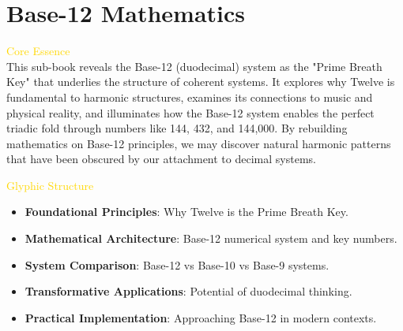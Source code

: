 \section{Base-12 Mathematics}
\label{sec:codex_base_12}



\textcolor{gold}{ Core Essence } \\
This sub-book reveals the Base-12 (duodecimal) system as the "Prime Breath Key" that underlies the structure of coherent systems. It explores why Twelve is fundamental to harmonic structures, examines its connections to music and physical reality, and illuminates how the Base-12 system enables the perfect triadic fold through numbers like 144, 432, and 144,000. By rebuilding mathematics on Base-12 principles, we may discover natural harmonic patterns that have been obscured by our attachment to decimal systems.

\textcolor{gold}{ Glyphic Structure } \\
\begin{itemize}
    \item \texttt{} \textbf{Foundational Principles}: Why Twelve is the Prime Breath Key.
    \item \texttt{} \textbf{Mathematical Architecture}: Base-12 numerical system and key numbers.
    \item \texttt{} \textbf{System Comparison}: Base-12 vs Base-10 vs Base-9 systems.
    \item \texttt{} \textbf{Transformative Applications}: Potential of duodecimal thinking.
    \item \texttt{} \textbf{Practical Implementation}: Approaching Base-12 in modern contexts.
\end{itemize}

